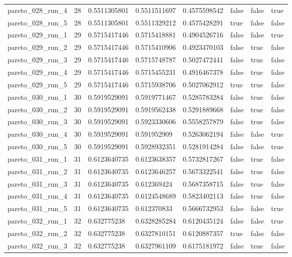 \begin{tabular}{@{}llllllll@{}}
pareto\_028\_run\_4 & 28 & 0.5511305801 & 0.5511511697 & 0.4575598542 & false & false & true \\
pareto\_028\_run\_5 & 28 & 0.5511305801 & 0.5511329212 & 0.4575428291 & true & false & false \\
pareto\_029\_run\_1 & 29 & 0.5715417446 & 0.5715418881 & 0.4904526716 & false & false & true \\
pareto\_029\_run\_2 & 29 & 0.5715417446 & 0.5715410906 & 0.4923470103 & false & true & false \\
pareto\_029\_run\_3 & 29 & 0.5715417446 & 0.5715748787 & 0.5027472441 & false & true & false \\
pareto\_029\_run\_4 & 29 & 0.5715417446 & 0.5715455231 & 0.4916467378 & false & true & false \\
pareto\_029\_run\_5 & 29 & 0.5715417446 & 0.5715938706 & 0.5027062912 & true & true & false \\
pareto\_030\_run\_1 & 30 & 0.5919529091 & 0.5919771467 & 0.5285783284 & false & true & false \\
pareto\_030\_run\_2 & 30 & 0.5919529091 & 0.5919562438 & 0.5291889668 & false & true & false \\
pareto\_030\_run\_3 & 30 & 0.5919529091 & 0.5923330606 & 0.5558257879 & false & true & false \\
pareto\_030\_run\_4 & 30 & 0.5919529091 & 0.591952909 & 0.5263062194 & false & false & true \\
pareto\_030\_run\_5 & 30 & 0.5919529091 & 0.5928932351 & 0.5281914284 & false & false & true \\
pareto\_031\_run\_1 & 31 & 0.6123640735 & 0.6123638357 & 0.5732817267 & false & true & false \\
pareto\_031\_run\_2 & 31 & 0.6123640735 & 0.6123646257 & 0.5673322541 & false & true & false \\
pareto\_031\_run\_3 & 31 & 0.6123640735 & 0.612369424 & 0.5687358715 & false & true & false \\
pareto\_031\_run\_4 & 31 & 0.6123640735 & 0.6124548689 & 0.5823402113 & false & true & false \\
pareto\_031\_run\_5 & 31 & 0.6123640735 & 0.612370833 & 0.5666732953 & false & false & true \\
pareto\_032\_run\_1 & 32 & 0.632775238 & 0.6328285284 & 0.6120435124 & false & false & true \\
pareto\_032\_run\_2 & 32 & 0.632775238 & 0.6327810151 & 0.6120887357 & true & false & false \\
pareto\_032\_run\_3 & 32 & 0.632775238 & 0.6327961109 & 0.6175181972 & false & true & false \\

\end{tabular}
